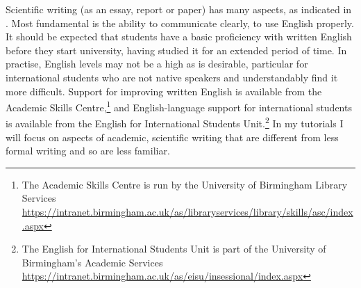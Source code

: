 Scientific writing (as an essay, report or paper) has many aspects, as indicated in . Most fundamental is the ability to communicate clearly, to use English properly. It should be expected that students have a basic proficiency with written English before they start university, having studied it for an extended period of time. In practise, English levels may not be a high as is desirable, particular for international students who are not native speakers and understandably find it more difficult. Support for improving written English is available from the Academic Skills Centre,\footnote{The Academic Skills Centre is run by the University of Birmingham Library Services \url{https://intranet.birmingham.ac.uk/as/libraryservices/library/skills/asc/index.aspx}} and English-language support for international students is available from the English for International Students Unit.\footnote{The English for International Students Unit is part of the University of Birmingham's Academic Services \url{https://intranet.birmingham.ac.uk/as/eisu/insessional/index.aspx}} In my tutorials I will focus on aspects of academic, scientific writing that are different from less formal writing and so are less familiar.


